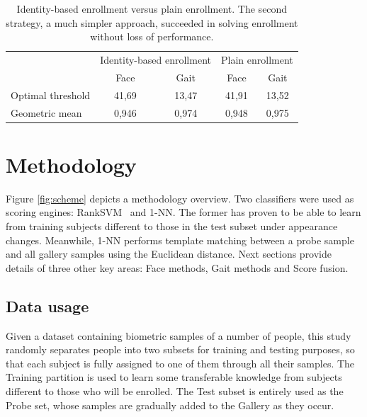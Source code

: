 \documentclass{llncs}
\begin{document}
\begin{table}[t]
\centering
\begin{tabular}{l|c|c|c|c|}
\cline{2-5}
& \multicolumn{2}{c|}{Identity-based enrollment} & \multicolumn{2}{c|}{Plain enrollment} \\ 
\cline{2-5} 
& Face & Gait & Face & Gait \\ 
\hline
\multicolumn{1}{|l|}{Optimal threshold} & 41,69 & 13,47	& 41,91 & 13,52 \\ 
\hline 
\multicolumn{1}{|l|}{Geometric mean} & 0,946 & 0,974 & 0,948 & 0,975 \\ 
\hline 
\end{tabular} 
\vspace{1mm}
\caption{Identity-based enrollment versus plain enrollment. The second strategy, a much simpler approach, succeeded in solving enrollment without loss of performance.}
\label{tab:plainenroll}
\end{table}

\section{Methodology}\label{sec:methodology}

\vspace{-2mm}
Figure \ref{fig:scheme} depicts a methodology overview. Two classifiers were used as scoring engines: RankSVM~\cite{RaulECCV:2012} and 1-NN. The former has proven to be able to learn from training subjects different to those in the test subset under appearance changes. Meanwhile, 1-NN performs template matching between a probe sample and all gallery samples using the Euclidean distance. Next sections provide details of three other key areas: Face methods, Gait methods and Score fusion. 

\subsection{Data usage}\label{subsec:dusage}

\vspace{-1mm}
Given a dataset containing biometric samples of a number of people, this study randomly separates people into two subsets for training and testing purposes, so that each subject is fully assigned to one of them through all their samples. The Training partition is used to learn some transferable knowledge from subjects different to those who will be enrolled. The Test subset is entirely used as the Probe set, whose samples are gradually added to the Gallery as they occur. 
\end{document}
